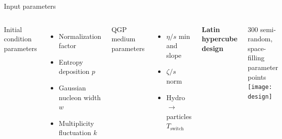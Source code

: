 \documentclass{beamer}
\begin{document}
\begin{frame}{Input parameters}
  \begin{columns}
    Initial condition parameters
    \begin{itemize}
      \item Normalization factor
      \item Entropy deposition $p$
      \item Gaussian nucleon width $w$
      \item Multiplicity fluctuation $k$
    \end{itemize}
    \medskip
    QGP medium parameters
    \begin{itemize}
      \item $\eta/s$ min and slope
      \item $\zeta/s$ norm
      \item Hydro $\rightarrow$ particles $T_\text{switch}$
    \end{itemize}
    \begin{center}
      \textbf{Latin hypercube design}
    \end{center}
    300 semi-random, space-filling parameter points \\[1em]
    \texttt{[image: design]}
  \end{columns}
\end{frame}
\end{document}
